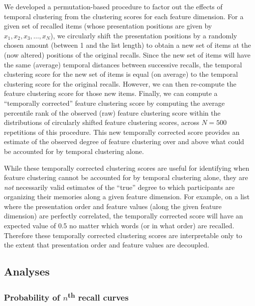 \documentclass[11pt]{article}
\begin{document}
We developed a permutation-based procedure to factor out the effects of
temporal clustering from the clustering scores for each feature dimension. For
a given set of recalled items (whose presentation positions are given by $x_1,
x_2, x_3, …, x_N$), we circularly shift the presentation positions by a
randomly chosen amount (between 1 and the list length) to obtain a new set of
items at the (now altered) positions of the original recalls. Since the new
set of items will have the same (average) temporal distances between successive
recalls, the temporal clustering score for the new set of items is equal (on
average) to the temporal clustering score for the original recalls. However, we
can then re-compute the feature clustering score for those new items. Finally,
we can compute a ``temporally corrected'' feature clustering score by computing
the average percentile rank of the observed (raw) feature clustering score
within the distributions of circularly shifted feature clustering scores,
across $N = 500$ repetitions of this procedure. This new temporally corrected
score provides an estimate of the observed degree of feature clustering over
and above what could be accounted for by temporal clustering alone.

While these temporally corrected clustering scores are useful for identifying
when feature clustering cannot be accounted for by temporal clustering alone,
they are \textit{not} necessarily valid estimates of the ``true'' degree to
which participants are organizing their memories along a given feature
dimension. For example, on a list where the presentation order and feature
values (along the given feature dimension) are perfectly correlated, the
temporally corrected score will have an expected value of 0.5 no matter which
words (or in what order) are recalled. Therefore these temporally corrected
clustering scores are interpretable only to the extent that presentation order
and feature values are decoupled.

\subsection*{Analyses}

\subsubsection*{Probability of $n$\textsuperscript{th} recall curves}
\end{document}
